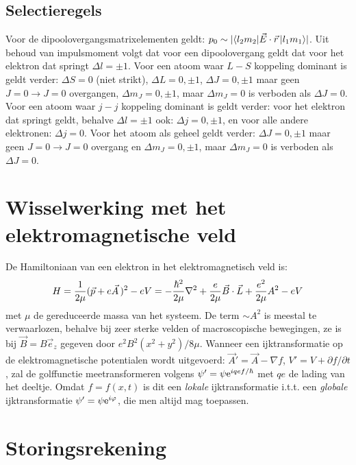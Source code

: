 \subsection[~~Selectieregels]{Selectieregels}
Voor de dipoolovergangsmatrixelementen geldt:
$p_0\sim|\langle l_2m_2|\vec{E}\cdot\vec{r}\,|l_1m_1\rangle|$. Uit behoud van
impulsmoment volgt dat voor een dipoolovergang geldt dat voor het elektron
dat springt $\Delta l=\pm1$.
\npar
Voor een atoom waar $L-S$ koppeling dominant is geldt verder: $\Delta S=0$
(niet strikt), $\Delta L=0,\pm1$, $\Delta J=0,\pm1$ maar geen
$J=0\rightarrow J=0$ overgangen, $\Delta m_J=0,\pm1$, maar $\Delta m_J=0$
is verboden als $\Delta J=0$.
\npar
Voor een atoom waar $j-j$ koppeling dominant is geldt verder: voor het
elektron dat springt geldt, behalve $\Delta l=\pm1$ ook: $\Delta j=0,\pm1$,
en voor alle andere elektronen: $\Delta j=0$. Voor het atoom als geheel geldt
verder: $\Delta J=0,\pm1$ maar geen $J=0\rightarrow J=0$ overgang en
$\Delta m_J=0,\pm1$, maar $\Delta m_J=0$ is verboden als $\Delta J=0$.

\section[~~Wisselwerking met het elektromagnetische veld]{Wisselwerking met het elektromagnetische veld}
De Hamiltoniaan van een elektron in het elektromagnetisch veld is:
\[
H=\frac{1}{2\mu}(\vec{p}+e\vec{A}\,)^2-eV=-\frac{\hbar^2}{2\mu}\nabla^2+
\frac{e}{2\mu}\vec{B}\cdot\vec{L}+\frac{e^2}{2\mu}A^2-eV
\]
met $\mu$ de gereduceerde massa van het systeem. De term $\sim A^2$ is meestal
te verwaarlozen, behalve bij zeer sterke velden of macroscopische bewegingen,
ze is bij $\vec{B}=B\vec{e}_z$ gegeven door $e^2B^2(x^2+y^2)/8\mu$.
\npar
Wanneer een ijktransformatie op de elektromagnetische potentialen wordt
uitgevoerd: $\vec{A}'=\vec{A}-\nabla f$, $V'=V+\partial f/\partial t$, zal de
golffunctie meetransformeren volgens $\psi'=\psi{\rm e}^{iqef/\hbar}$ met
$qe$ de lading van het deeltje. Omdat $f=f(x,t)$ is dit een {\it lokale}
ijktransformatie i.t.t. een {\it globale} ijktransformatie
$\psi'=\psi{\rm e}^{i\varphi}$, die men altijd mag toepassen.

\section[~~Storingsrekening]{Storingsrekening}
